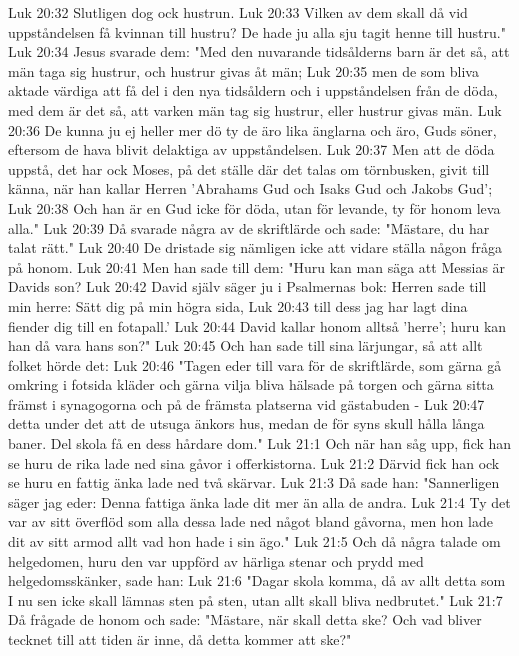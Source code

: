 Luk 20:32  Slutligen dog ock hustrun.
Luk 20:33  Vilken av dem skall då vid uppståndelsen få kvinnan till hustru? De hade ju alla sju tagit henne till hustru."
Luk 20:34  Jesus svarade dem: "Med den nuvarande tidsålderns barn är det så, att män taga sig hustrur, och hustrur givas åt män;
Luk 20:35  men de som bliva aktade värdiga att få del i den nya tidsåldern och i uppståndelsen från de döda, med dem är det så, att varken män tag sig hustrur, eller hustrur givas män.
Luk 20:36  De kunna ju ej heller mer dö ty de äro lika änglarna och äro, Guds söner, eftersom de hava blivit delaktiga av uppståndelsen.
Luk 20:37  Men att de döda uppstå, det har ock Moses, på det ställe där det talas om törnbusken, givit till känna, när han kallar Herren 'Abrahams Gud och Isaks Gud och Jakobs Gud';
Luk 20:38  Och han är en Gud icke för döda, utan för levande, ty för honom leva alla."
Luk 20:39  Då svarade några av de skriftlärde och sade: "Mästare, du har talat rätt."
Luk 20:40  De dristade sig nämligen icke att vidare ställa någon fråga på honom.
Luk 20:41  Men han sade till dem: "Huru kan man säga att Messias är Davids son?
Luk 20:42  David själv säger ju i Psalmernas bok: Herren sade till min herre: Sätt dig på min högra sida,
Luk 20:43  till dess jag har lagt dina fiender dig till en fotapall.'
Luk 20:44  David kallar honom alltså 'herre'; huru kan han då vara hans son?"
Luk 20:45  Och han sade till sina lärjungar, så att allt folket hörde det:
Luk 20:46  "Tagen eder till vara för de skriftlärde, som gärna gå omkring i fotsida kläder och gärna vilja bliva hälsade på torgen och gärna sitta främst i synagogorna och på de främsta platserna vid gästabuden -
Luk 20:47  detta under det att de utsuga änkors hus, medan de för syns skull hålla långa baner. Del skola få en dess hårdare dom."
Luk 21:1  Och när han såg upp, fick han se huru de rika lade ned sina gåvor i offerkistorna.
Luk 21:2  Därvid fick han ock se huru en fattig änka lade ned två skärvar.
Luk 21:3  Då sade han: "Sannerligen säger jag eder: Denna fattiga änka lade dit mer än alla de andra.
Luk 21:4  Ty det var av sitt överflöd som alla dessa lade ned något bland gåvorna, men hon lade dit av sitt armod allt vad hon hade i sin ägo."
Luk 21:5  Och då några talade om helgedomen, huru den var uppförd av härliga stenar och prydd med helgedomsskänker, sade han:
Luk 21:6  "Dagar skola komma, då av allt detta som I nu sen icke skall lämnas sten på sten, utan allt skall bliva nedbrutet."
Luk 21:7  Då frågade de honom och sade: "Mästare, när skall detta ske? Och vad bliver tecknet till att tiden är inne, då detta kommer att ske?"
